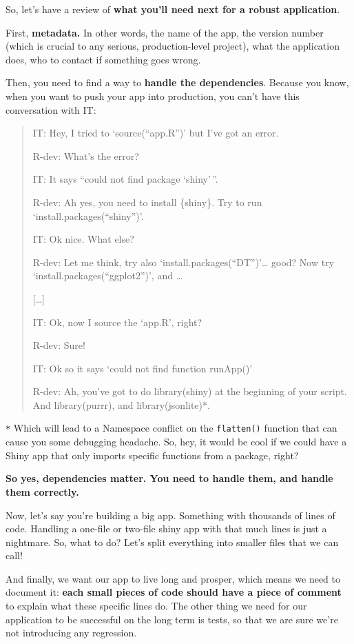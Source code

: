 \documentclass[]{book}
\begin{document}
So, let's have a review of \textbf{what you'll need next for a robust application}.

First, \textbf{metadata.} In other words, the name of the app, the version number (which is crucial to any serious, production-level project), what the application does, who to contact if something goes wrong.

Then, you need to find a way to \textbf{handle the dependencies}. Because you know, when you want to push your app into production, you can't have this conversation with IT:

\begin{quote}
IT: Hey, I tried to `source(``app.R'')' but I've got an error.

R-dev: What's the error?

IT: It says ``could not find package `shiny'\,''.

R-dev: Ah yes, you need to install \{shiny\}. Try to run `install.packages(``shiny'')'.

IT: Ok nice. What else?

R-dev: Let me think, try also `install.packages(``DT'')'\ldots{} good? Now try `install.packages(``ggplot2'')', and \ldots{}

{[}\ldots{}{]}

IT: Ok, now I source the `app.R', right?

R-dev: Sure!

IT: Ok so it says `could not find function runApp()'

R-dev: Ah, you've got to do library(shiny) at the beginning of your script. And library(purrr), and library(jsonlite)*.
\end{quote}

\texttt{*} Which will lead to a Namespace conflict on the \texttt{flatten()} function that can cause you some debugging headache. So, hey, it would be cool if we could have a Shiny app that only imports specific functions from a package, right?

\textbf{So yes, dependencies matter. You need to handle them, and handle them correctly. }

Now, let's say you're building a big app. Something with thousands of lines of code. Handling a one-file or two-file shiny app with that much lines is just a nightmare. So, what to do? Let's split everything into smaller files that we can call!

And finally, we want our app to live long and prosper, which means we need to document it: \textbf{each small pieces of code should have a piece of comment} to explain what these specific lines do. The other thing we need for our application to be successful on the long term is tests, so that we are sure we're not introducing any regression.
\end{document}
